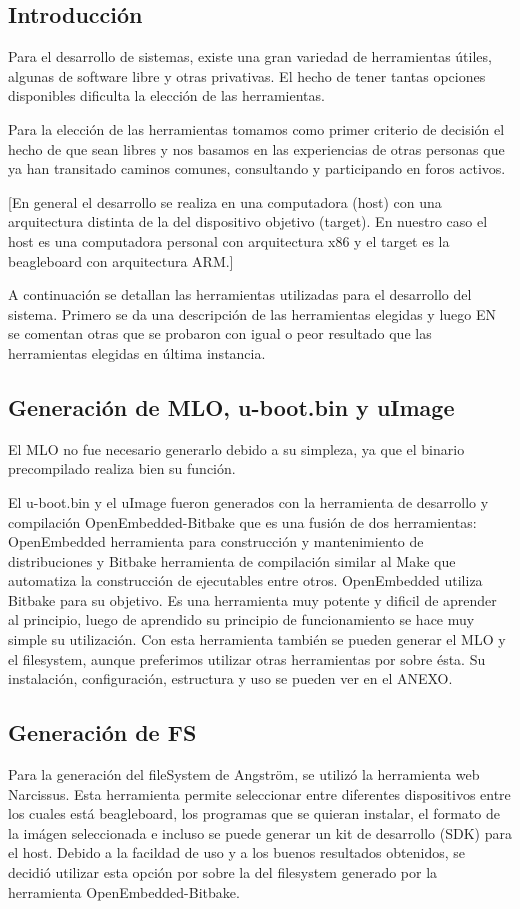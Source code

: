 \subsection{Introducción}
Para el desarrollo de sistemas, existe una gran variedad de herramientas útiles, algunas de software libre y otras privativas. El hecho de tener tantas opciones disponibles dificulta la elección de las herramientas. 

Para la elección de las herramientas tomamos como primer criterio de decisión el hecho de que sean libres y nos basamos en las experiencias de otras personas que ya han transitado caminos comunes, consultando y participando en foros activos.

[En general el desarrollo se realiza en una computadora (host) con una arquitectura distinta de la del dispositivo objetivo (target). En nuestro caso el host es una computadora personal con arquitectura x86 y el target es la beagleboard con arquitectura ARM.]

A continuación se detallan las herramientas utilizadas para el desarrollo del sistema. 
Primero se da una descripción de las herramientas elegidas y luego EN se comentan otras que se probaron con igual o peor resultado que las herramientas elegidas en última instancia.


\subsection{Generación de MLO, u-boot.bin y uImage}
El MLO no fue necesario generarlo debido a su simpleza, ya que el binario precompilado realiza bien su función.

El u-boot.bin y el uImage fueron generados con la herramienta de desarrollo y compilación OpenEmbedded-Bitbake que es una fusión de dos herramientas: OpenEmbedded herramienta para construcción y mantenimiento de distribuciones y Bitbake herramienta de compilación similar al Make que automatiza la construcción de ejecutables entre otros. OpenEmbedded utiliza Bitbake para su objetivo. Es una herramienta muy potente y dificil de aprender al principio, luego de aprendido su principio de funcionamiento se hace muy simple su utilización.
Con esta herramienta también se pueden generar el MLO y el filesystem, aunque preferimos utilizar otras herramientas por sobre ésta. 
Su instalación, configuración, estructura y uso se pueden ver en el ANEXO.


\subsection{Generación de FS}
Para la generación del fileSystem de Angström, se utilizó la herramienta web Narcissus.
Esta herramienta permite seleccionar entre diferentes dispositivos entre los cuales está beagleboard, los programas que se quieran instalar, el formato de la imágen seleccionada e incluso se puede generar un kit de desarrollo (SDK) para el host. Debido a la facildad de uso y a los buenos resultados obtenidos, se decidió utilizar esta opción por sobre la del filesystem generado por la herramienta OpenEmbedded-Bitbake.


